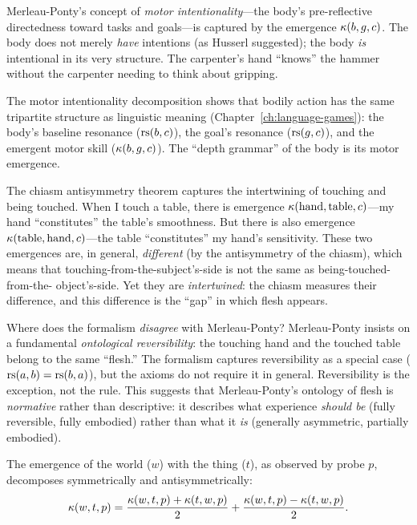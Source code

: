 \begin{interpretation}
\label{interp:merleau-ponty}
Merleau-Ponty's concept of \emph{motor intentionality}---the body's
pre-reflective directedness toward tasks and goals---is captured by the
emergence $\kappa(b, g, c)$. The body does not merely \emph{have} intentions
(as Husserl suggested); the body \emph{is} intentional in its very structure.
The carpenter's hand ``knows'' the hammer without the carpenter needing to
think about gripping.

The motor intentionality decomposition shows that bodily action has the same
tripartite structure as linguistic meaning (Chapter~\ref{ch:language-games}):
the body's baseline resonance ($\mathrm{rs}(b, c)$), the goal's resonance ($\mathrm{rs}(g, c)$),
and the emergent motor skill ($\kappa(b, g, c)$). The ``depth grammar'' of
the body is its motor emergence.

The chiasm antisymmetry theorem captures the intertwining of touching and
being touched. When I touch a table, there is emergence $\kappa(\text{hand},
\text{table}, c)$---my hand ``constitutes'' the table's smoothness. But there
is also emergence $\kappa(\text{table}, \text{hand}, c)$---the table
``constitutes'' my hand's sensitivity. These two emergences are, in general,
\emph{different} (by the antisymmetry of the chiasm), which means that
touching-from-the-subject's-side is not the same as being-touched-from-the-%
object's-side. Yet they are \emph{intertwined}: the chiasm measures their
difference, and this difference is the ``gap'' in which flesh appears.

Where does the formalism \emph{disagree} with Merleau-Ponty? Merleau-Ponty
insists on a fundamental \emph{ontological reversibility}: the touching hand
and the touched table belong to the same ``flesh.'' The formalism captures
reversibility as a special case ($\mathrm{rs}(a, b) = \mathrm{rs}(b, a)$), but the axioms
do not require it in general. Reversibility is the exception, not the rule.
This suggests that Merleau-Ponty's ontology of flesh is \emph{normative}
rather than descriptive: it describes what experience \emph{should be}
(fully reversible, fully embodied) rather than what it \emph{is} (generally
asymmetric, partially embodied).
\end{interpretation}

\begin{theorem}
\label{thm:world-flesh}
The emergence of the world ($w$) with the thing ($t$), as observed by
probe $p$, decomposes symmetrically and antisymmetrically:
\[
\kappa(w, t, p) = \frac{\kappa(w,t,p) + \kappa(t,w,p)}{2}
+ \frac{\kappa(w,t,p) - \kappa(t,w,p)}{2}.
\]
\end{theorem}

